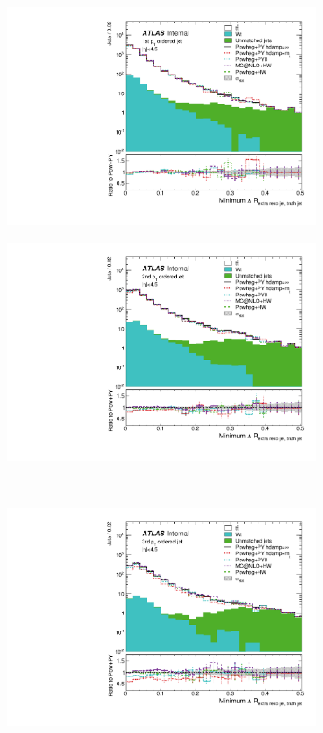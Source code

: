 \begin{figure}
\centering
\begin{subfigure}[]{0.45\textwidth}
\includegraphics[width=\textwidth]{fig/MCComp/NLO/GrandPtVsTruthDRJet0.pdf}
\end{subfigure}
\begin{subfigure}[]{0.45\textwidth}
\includegraphics[width=\textwidth]{fig/MCComp/NLO/GrandPtVsTruthDRJet1.pdf}
\end{subfigure}
\\
\begin{subfigure}[]{0.45\textwidth}
\includegraphics[width=\textwidth]{fig/MCComp/NLO/GrandPtVsTruthDRJet2.pdf}

\end{subfigure}
\end{figure}
